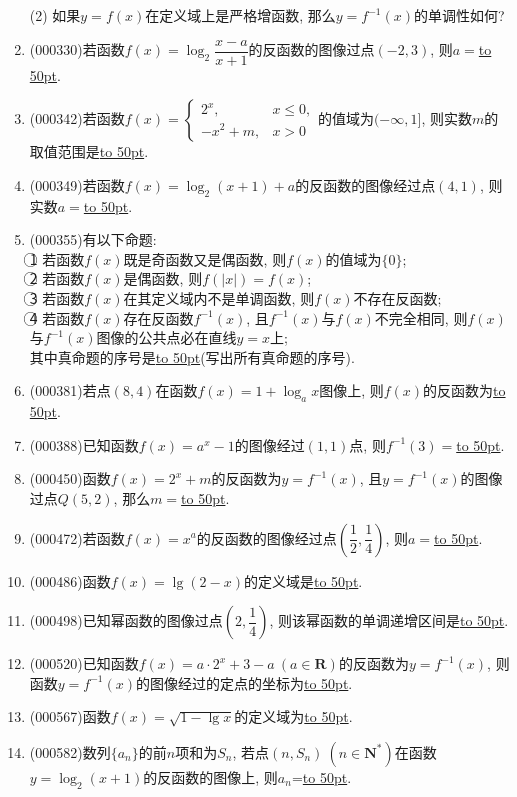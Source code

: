 \documentclass[10pt,a4paper]{article}
\newcommand{\blank}[1]{\underline{\hbox to #1pt{}}}
\begin{document}
\begin{enumerate}[1.]
(2) 如果$y=f(x)$在定义域上是严格增函数, 那么$y=f^{-1}(x)$的单调性如何?
\item {\tiny (000330)}若函数$f(x)=\log_2\dfrac{x-a}{x+1}$的反函数的图像过点$(-2,3)$, 则$a=$\blank{50}.
\item {\tiny (000342)}若函数$f(x)=\begin{cases}    2^x, & x\le 0, \\ -x^2+m, & x>0 \end{cases}$的值域为$(-\infty ,1]$, 则实数$m$的取值范围是\blank{50}.
\item {\tiny (000349)}若函数$f(x)=\log_2 (x+1)+a$的反函数的图像经过点$(4,1)$, 则实数$a=$\blank{50}.
\item {\tiny (000355)}有以下命题:\\
\textcircled{1} 若函数$f(x)$既是奇函数又是偶函数, 则$f(x)$的值域为$\{0\}$; \\
\textcircled{2} 若函数$f(x)$是偶函数, 则$f(|x|)=f(x)$;\\
\textcircled{3} 若函数$f(x)$在其定义域内不是单调函数, 则$f(x)$不存在反函数;\\
\textcircled{4} 若函数$f(x)$存在反函数${{f}^{-1}}(x)$, 且${{f}^{-1}}(x)$与$f(x)$不完全相同, 则$f(x)$与${{f}^{-1}}(x)$图像的公共点必在直线$y=x$上; \\
其中真命题的序号是\blank{50}(写出所有真命题的序号).
\item {\tiny (000381)}若点$(8,4)$在函数$f(x)=1+\log_a x$图像上, 则$f(x)$的反函数为\blank{50}.
\item {\tiny (000388)}已知函数$f(x)=a^x-1$的图像经过$(1,1)$点, 则$f^{-1}(3)=$\blank{50}.
\item {\tiny (000450)}函数$f(x)=2^x+m$的反函数为$y=f^{-1}(x)$, 且$y=f^{-1}(x)$的图像过点$Q(5,2)$, 那么$m=$\blank{50}.
\item {\tiny (000472)}若函数$f(x)=x^a$的反函数的图像经过点$(\dfrac12,\dfrac14)$, 则$a=$\blank{50}.
\item {\tiny (000486)}函数$f(x)=\lg(2-x)$的定义域是\blank{50}.
\item {\tiny (000498)}已知幂函数的图像过点$(2,\dfrac14)$, 则该幂函数的单调递增区间是\blank{50}.
\item {\tiny (000520)}已知函数$f(x)=a\cdot 2^x+3-a\ (a\in \mathbf{R})$的反函数为$y=f^{-1}(x)$, 则函数$y=f^{-1}(x)$的图像经过的定点的坐标为\blank{50}.
\item {\tiny (000567)}函数$f(x)=\sqrt{1-\lg x}$的定义域为\blank{50}.
\item {\tiny (000582)}数列$\{a_n\}$的前$n$项和为$S_n$, 若点$(n,S_n) \ (n\in \mathbf{N}^*)$在函数$y=\log_2 (x+1)$的反函数的图像上, 则$a_n$=\blank{50}.

\end{enumerate}
\end{document}
